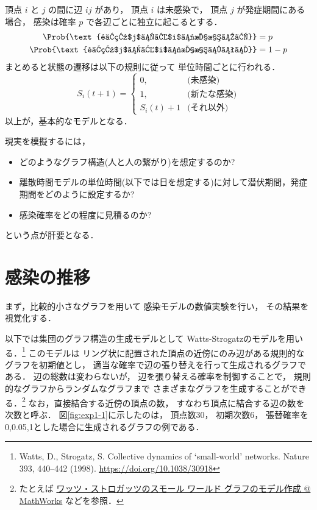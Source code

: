 \documentclass[10pt,oneside]{scrartcl}
\begin{document}
頂点 \(i\) と \(j\) の間に辺 \(ij\) があり，
頂点 \(i\) は未感染で，
頂点 \(j\) が発症期間にある場合，
感染は確率 \(p\) で各辺ごとに独立に起こるとする．
\begin{align}
  \Prob{\text{頂点$j$から$i$に感染する}} &=p\\
  \Prob{\text{頂点$j$から$i$に感染しない}}&=1-p
\end{align}
まとめると状態の遷移は以下の規則に従って
単位時間ごとに行われる．
\begin{equation}
  S_{i}(t{+}1)
  =
  \begin{cases}
    0,&\text{(未感染)}\\
    1,&\text{(新たな感染)}\\
    S_{i}(t)+1&\text{(それ以外)}
  \end{cases}
\end{equation}
以上が，基本的なモデルとなる．

現実を模擬するには，
\begin{itemize}
\item どのようなグラフ構造(人と人の繋がり)を想定するのか?
\item 離散時間モデルの単位時間(以下では日を想定する)に対して潜伏期間，発症期間をどのように設定するか?
\item 感染確率をどの程度に見積るのか?
\end{itemize}
という点が肝要となる．

\section{感染の推移}
\label{sec:org4f167ff}

まず，比較的小さなグラフを用いて
感染モデルの数値実験を行い，
その結果を視覚化する．

\begin{figure*}%
  \centering
\end{figure*}

以下では集団のグラフ構造の生成モデルとして
Watts-Strogatzのモデルを用いる．\footnote{Watts, D., Strogatz, S. Collective dynamics of ‘small-world’ networks. Nature 393, 440–442 (1998). \url{https://doi.org/10.1038/30918}}
このモデルは
リング状に配置された頂点の近傍にのみ辺がある規則的なグラフを初期値とし，
適当な確率で辺の張り替えを行って生成されるグラフである．
辺の総数は変わらないが，
辺を張り替える確率を制御することで，
規則的なグラフからランダムなグラフまで
さまざまなグラフを生成することができる．\footnote{たとえば \href{https://jp.mathworks.com/help/matlab/math/build-watts-strogatz-small-world-graph-model.html}{ワッツ・ストロガッツのスモール ワールド グラフのモデル作成 @ MathWorks} 
などを参照．}
なお，直接結合する近傍の頂点の数，
すなわち頂点に結合する辺の数を次数と呼ぶ．
図\ref{fig:exp1-1}に示したのは，
頂点数30，
初期次数6，
張替確率を0,0.05,1とした場合に生成されるグラフの例である．
\end{document}
